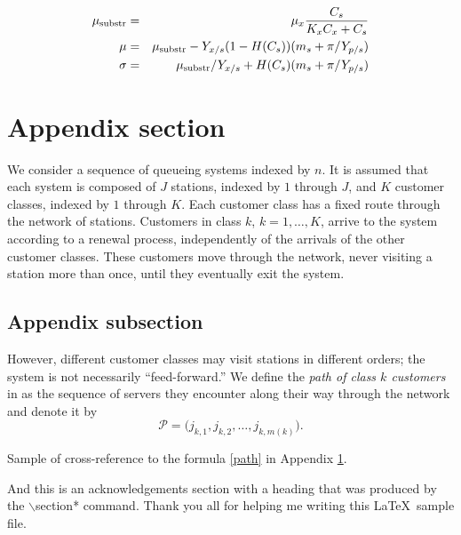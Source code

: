\documentclass[ejs]{imsart}
\numberwithin{equation}{section}
\theoremstyle{plain}
\theoremstyle{definition}
\theoremstyle{remark}
\begin{document}
\begin{eqnarray}
 \mu_{\rm substr} & = & \mu_{x} \frac{C_{s}}{K_{x}C_{x}+C_{s}}  \\
 \mu              & = & \mu_{\rm substr} - Y_{x/s}(1-H(C_{s}))(m_{s}+\pi /Y_{p/s}) \\
 \sigma           & = & \mu_{\rm substr}/Y_{x/s}+ H(C_{s}) (m_{s}+ \pi /Y_{p/s})
\end{eqnarray}

\appendix

\section{Appendix section}\label{app}

We consider a sequence of queueing systems
indexed by $n$.  It is assumed that each system
is composed of $J$ stations, indexed by $1$
through $J$, and $K$ customer classes, indexed
by $1$ through $K$.  Each customer class
has a fixed route through the network of
stations.  Customers in class
$k$, $k=1,\ldots,K$, arrive to the
system according to a
renewal process, independently of the arrivals
of the other customer classes.  These customers
move through the network, never visiting a station
more than once, until they eventually exit
the system.

\subsection{Appendix subsection}

However, different customer classes may visit
stations in different orders; the system
is not necessarily ``feed-forward.''
We define the {\em path of class $k$ customers} in
as the sequence of servers
they encounter along their way through the network
and denote it by
\begin{equation}
\mathcal{P}=\bigl(j_{k,1},j_{k,2},\dots,j_{k,m(k)}\bigr). \label{path}
\end{equation}

Sample of cross-reference to the formula \ref{path} in Appendix \ref{app}.

\begin{acks}[Acknowledgments]
And this is an acknowledgements section with a heading that was produced by the
$\backslash$section* command. Thank you all for helping me writing this
\LaTeX\ sample file.
\end{acks}

\begin{supplement}
\end{supplement}
\begin{supplement}
\end{supplement}



\end{document}
